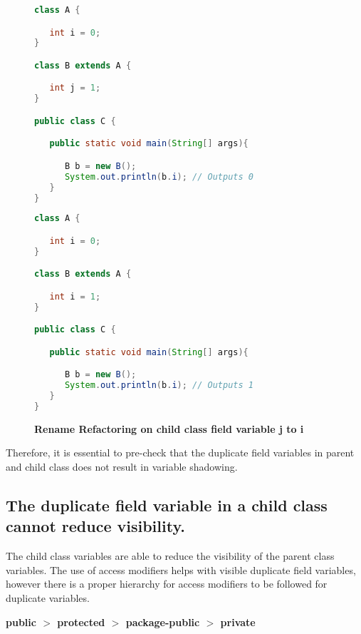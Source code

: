 \begin{figure}[th]
\centering
\begin{minipage}[t]{0.75\linewidth}
\begin{lstlisting}[language=java, basicstyle=\scriptsize\ttfamily,frame=single]
class A {

   int i = 0;
}

class B extends A {

   int j = 1; 
}

public class C {

   public static void main(String[] args){

      B b = new B();
      System.out.println(b.i); // Outputs 0
   }
}
\end{lstlisting}
\end{minipage}
\hfill
\begin{minipage}[t]{0.75\linewidth}
\begin{lstlisting}[language=java, basicstyle=\scriptsize\ttfamily,frame=single]
class A {

   int i = 0;
}

class B extends A {

   int i = 1; 
}

public class C {

   public static void main(String[] args){

      B b = new B();
      System.out.println(b.i); // Outputs 1
   }
}
\end{lstlisting}
\end{minipage}
\caption{\textbf{Rename Refactoring on child class field variable j to i}}
\label{figure:classEx}
\end{figure}

Therefore, it is essential to pre-check that the duplicate field variables in parent and child class does not result in variable shadowing. 

\subsection{The duplicate field variable in a child class cannot reduce visibility.}

The child class variables are able to reduce the visibility of the parent class variables. The use of access modifiers helps with visible duplicate field variables, however there is a proper hierarchy for access modifiers to be followed for duplicate variables.


\begin{center}
\textbf{public $>$ protected $>$ package-public $>$ private}
\end{center}


